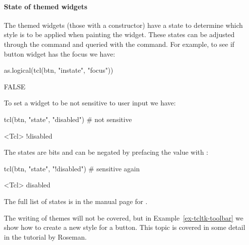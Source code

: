 \paragraph{State of themed widgets}

The themed widgets (those with a  constructor) have a state
to determine which style is to be applied when painting the
widget. These states can be adjusted through the  command
and queried with the  command. For example, to see if
button widget  has the focus we have:
\begin{Schunk}
\begin{Sinput}
 as.logical(tcl(btn, "instate", "focus"))
\end{Sinput}
\begin{Soutput}
[1] FALSE
\end{Soutput}
\end{Schunk}
To set a widget to be not sensitive to user input we have:
\begin{Schunk}
\begin{Sinput}
 tcl(btn, "state", "disabled")             # not sensitive
\end{Sinput}
\begin{Soutput}
<Tcl> !disabled 
\end{Soutput}
\end{Schunk}
The states are bits and can be negated by prefacing the value with \code{!}:
\begin{Schunk}
\begin{Sinput}
 tcl(btn, "state", "!disabled")            # sensitive again
\end{Sinput}
\begin{Soutput}
<Tcl> disabled 
\end{Soutput}
\end{Schunk}

The full list of states is in the manual page for .


The writing of themes will not be covered, but in
Example~\ref{ex-tcltk-toolbar} we show how to create a new style for a
button. This topic is covered in some detail in the \Tk\/ tutorial by Roseman.
\\



